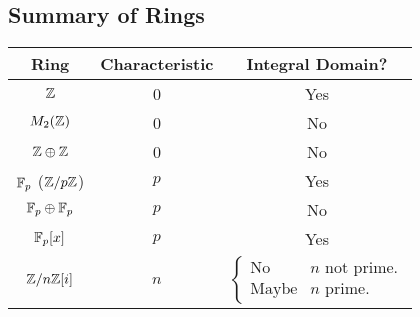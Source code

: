 \documentclass[letterpaper]{article}
\begin{document}
\subsection{Summary of Rings}
\begin{center}
    \begin{tabular}{c|c|c}
        \textbf{Ring}   & \textbf{Characteristic} & \textbf{Integral Domain?} \\ 
        \hline 
        $\mathbb{Z}$            & 0                       & Yes \\ 
        $M_{2}(\mathbb{Z})$     & 0                       & No \\ 
        $\mathbb{Z} \oplus \mathbb{Z}$  & 0                       & No \\ 
        $\mathbb{F}_p$ ($\mathbb{Z} / p\mathbb{Z}$) & $p$                 & Yes \\ 
        $\mathbb{F}_p \oplus \mathbb{F}_p$ & $p$                  & No \\ 
        $\mathbb{F}_{p}[x]$     & $p$                     & Yes \\ 
        $\mathbb{Z} / n\mathbb{Z}[i]$   & $n$                     & $\begin{cases}
            \text{No} & n \text{ not prime.} \\ 
            \text{Maybe} & n \text{ prime.}
        \end{cases}$
    \end{tabular}
\end{center}
\end{document}
